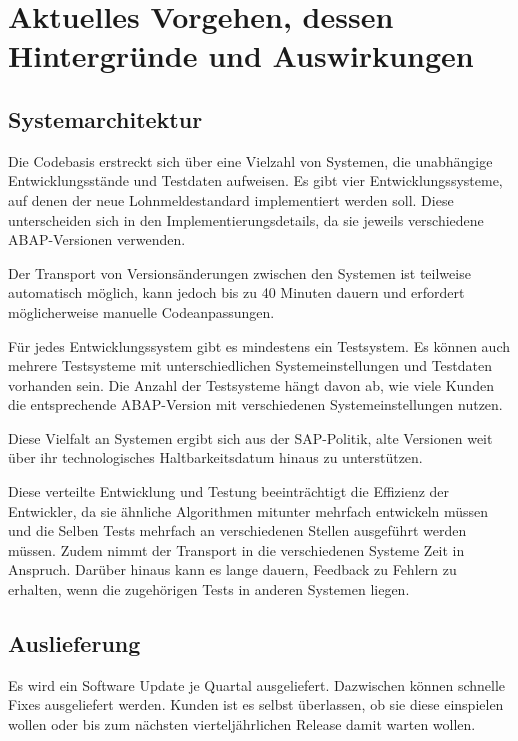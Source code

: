 \section{Aktuelles Vorgehen, dessen Hintergründe und Auswirkungen}

\subsection{Systemarchitektur}

Die Codebasis erstreckt sich über eine Vielzahl von Systemen, die unabhängige Entwicklungsstände und Testdaten aufweisen. 
Es gibt vier Entwicklungssysteme, auf denen der neue Lohnmeldestandard implementiert werden soll. Diese unterscheiden sich in den Implementierungsdetails, da sie jeweils verschiedene ABAP-Versionen verwenden.

Der Transport von Versionsänderungen zwischen den Systemen ist teilweise automatisch möglich, kann jedoch bis zu 40 Minuten dauern und erfordert möglicherweise manuelle Codeanpassungen.

Für jedes Entwicklungssystem gibt es mindestens ein Testsystem. Es können auch mehrere Testsysteme mit unterschiedlichen Systemeinstellungen und Testdaten vorhanden sein. Die Anzahl der Testsysteme hängt davon ab, wie viele Kunden die entsprechende ABAP-Version mit verschiedenen Systemeinstellungen nutzen.

Diese Vielfalt an Systemen ergibt sich aus der SAP-Politik, alte Versionen weit über ihr technologisches Haltbarkeitsdatum hinaus zu unterstützen.

Diese verteilte Entwicklung und Testung beeinträchtigt die Effizienz der Entwickler, da sie ähnliche Algorithmen mitunter mehrfach entwickeln müssen und die Selben Tests mehrfach an verschiedenen Stellen ausgeführt werden müssen.
Zudem nimmt der Transport in die verschiedenen Systeme Zeit in Anspruch. Darüber hinaus kann es lange dauern, Feedback zu Fehlern zu erhalten, wenn die zugehörigen Tests in anderen Systemen liegen.

\subsection{Auslieferung}

Es wird ein Software Update je Quartal ausgeliefert. Dazwischen können schnelle Fixes ausgeliefert werden. Kunden ist es selbst überlassen, ob sie diese einspielen wollen oder bis zum nächsten vierteljährlichen Release damit warten wollen.

